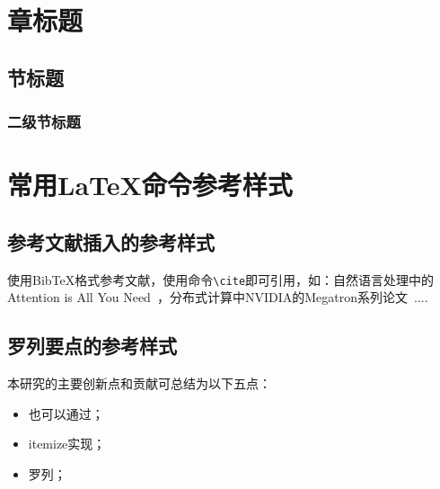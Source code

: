 \documentclass[twoside,zihao=-4,UTF8]{bjfu}
\begin{document}


\makeBjfuTitlePage
{}

\section{章标题}\label{sec:introduction}
\renewcommand{\headrulewidth}{0.8pt}

\subsection{节标题}\label{sec:background}

\subsubsection{二级节标题}

\section{常用LaTeX命令参考样式}
\renewcommand{\headrulewidth}{0.8pt}

\subsection{参考文献插入的参考样式}
使用BibTeX格式参考文献，使用命令\verb+\cite+即可引用，如：自然语言处理中的Attention is All You Need~\cite{vaswani2017attention}，分布式计算中NVIDIA的Megatron系列论文~\cite{shoeybi2019megatron, narayanan2021efficient, korthikanti2023reducing}....

\subsection{罗列要点的参考样式}
本研究的主要创新点和贡献可总结为以下五点：
\begin{itemize}
    \item 也可以通过；
    \item itemize实现；
    \item 罗列；
\end{itemize}
\end{document}
